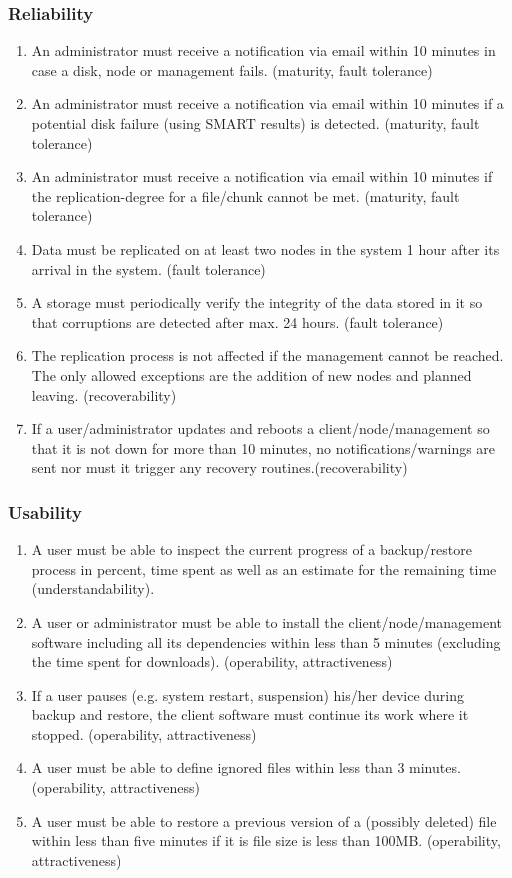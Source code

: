 \subsubsection{Reliability}

\begin{enumerate}
	\enumcountrestore
	\item An administrator must receive a notification via email within 10 minutes in case a disk, node or management fails. (maturity, fault tolerance)
	\item An administrator must receive a notification via email within 10 minutes if a potential disk failure (using SMART results) is detected. (maturity, fault tolerance)
	\item An administrator must receive a notification via email within 10 minutes if the replication-degree for a file/chunk cannot be met. (maturity, fault tolerance)
	\item Data must be replicated on at least two nodes in the system 1 hour after its arrival in the system. (fault tolerance)
	\item A storage must periodically verify the integrity of the data stored in it so that corruptions are detected after max. 24 hours. (fault tolerance)
	\item The replication process is not affected if the management cannot be reached. The only allowed exceptions are the addition of new nodes and planned leaving. (recoverability)
	\item If a user/administrator updates and reboots a client/node/management so that it is not down for more than 10 minutes, no notifications/warnings are sent nor must it trigger any recovery routines.(recoverability)
	\enumcountsave
\end{enumerate}

\subsubsection{Usability}
\begin{enumerate}
	\enumcountrestore
	\item A user must be able to inspect the current progress of a backup/restore process in percent, time spent as well as an estimate for the remaining time (understandability).
	\item A user or administrator must be able to install the client/node/management software including all its dependencies within less than 5 minutes (excluding the time spent for downloads). (operability, attractiveness)
	\item If a user pauses (e.g. system restart, suspension) his/her device during backup and restore, the client software must continue its work where it stopped. (operability, attractiveness)
	\item A user must be able to define ignored files within less than 3 minutes. (operability, attractiveness)
	\item A user must be able to restore a previous version of a (possibly deleted) file within less than five minutes if it is file size is less than 100MB. (operability, attractiveness)
	\enumcountsave
\end{enumerate}

